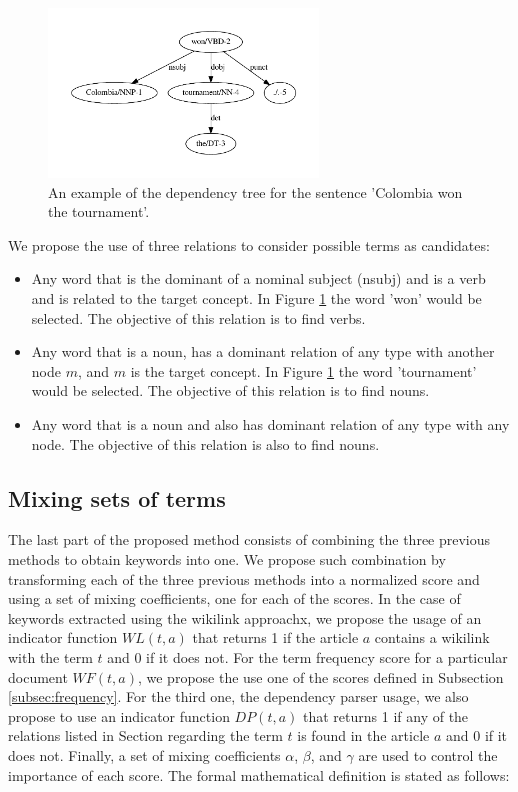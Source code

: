 \documentclass[oribibl]{llncs}
\begin{document}
\begin{figure}[h]
\centering
\includegraphics[height=4.5cm]{images/depex}
\caption{An example of the dependency tree for the sentence 'Colombia won the tournament'.}
\label{fig:depex}
\end{figure}

We propose the use of three relations to consider possible terms as candidates: 

\begin{itemize}
\item Any word that is the dominant of a nominal subject (nsubj) and is a verb and is related to the target concept. In Figure \ref{fig:depex} the word 'won' would be selected. The objective of this relation is to find verbs.
\item Any word that is a noun, has a dominant relation of any type with another node $m$, and $m$ is the target concept. In Figure \ref{fig:depex} the word 'tournament' would be selected. The objective of this relation is to find nouns.  
\item Any word that is a noun and also has dominant relation of any type  with any node. The objective of this relation is also to find nouns.
\end{itemize}


\subsection{Mixing sets of terms} \label{subsec:mixing}

The last part of the proposed method consists of combining the three previous methods to obtain keywords into one. We propose such combination by transforming each of the three previous methods into a normalized score and using a set of mixing coefficients, one for each of the scores. In the case of keywords extracted using the wikilink approachx, we propose the usage of an indicator function $WL(t,a)$ that returns 1 if the article $a$ contains a wikilink with the term $t$ and 0 if it does not. For the term frequency score for a particular document $WF(t,a)$, we propose the use one of the scores defined in Subsection \ref{subsec:frequency}. For the third one, the dependency parser usage, we also propose to use an indicator function $DP(t, a)$ that returns 1 if any of the relations listed in Section \label{subsec:parsing} regarding the term $t$ is found in the article $a$ and 0 if it does not. Finally, a set of mixing coefficients $\alpha$, $\beta$, and $\gamma$ are used to control the importance of each score. The formal mathematical definition is stated as follows:   
\end{document}
